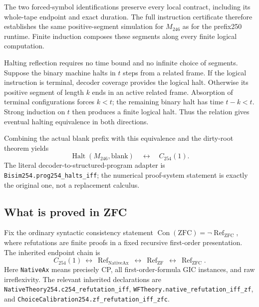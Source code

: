 The two forced-symbol identifications preserve every local contract,
including its whole-tape endpoint and exact duration.  The full instruction
certificate therefore establishes the same positive-segment simulation
for $M_{246}$ as for the prefix250 runtime.  Finite induction composes these
segments along every finite logical computation.

Halting reflection requires no time bound and no infinite choice of
segments.  Suppose the binary machine halts in $t$ steps from a related
frame.  If the logical instruction is terminal, decoder coverage provides
the logical halt.  Otherwise its positive segment of length $k$ ends in an
active related frame.  Absorption of terminal configurations forces $k<t$;
the remaining binary halt has time $t-k<t$.  Strong induction on $t$ then
produces a finite logical halt.  Thus the relation gives eventual halting
equivalence in both directions.

Combining the actual blank prefix with this equivalence and the dirty-root
theorem yields
\[
 \operatorname{Halt}(M_{246},\mathrm{blank})
 \quad\longleftrightarrow\quad C_{254}(1).
\]
The literal decoder-to-structured-program adapter is
\texttt{Bisim254.prog254\_halts\_iff}; the numerical proof-system
statement is exactly the original one, not a replacement calculus.

\subsection{What is proved in ZFC}

Fix the ordinary syntactic consistency statement
$\operatorname{Con}(\mathrm{ZFC})=\neg\operatorname{Ref}_{\mathrm{ZFC}}$,
where refutations are finite proofs in a fixed recursive first-order
presentation.  The inherited endpoint chain is
\[
 C_{254}(1)
 \ \longleftrightarrow\ 
 \operatorname{Ref}_{\mathrm{NativeAx}}
 \ \longleftrightarrow\ 
 \operatorname{Ref}_{\mathrm{ZF}}
 \ \longleftrightarrow\ 
 \operatorname{Ref}_{\mathrm{ZFC}}.
\]
Here \texttt{NativeAx} means precisely CP, all first-order-formula GIC
instances, and raw irreflexivity.  The relevant inherited declarations are
\texttt{NativeTheory254.c254\_refutation\_iff},
\texttt{WFTheory.native\_refutation\_iff\_zf}, and
\texttt{ChoiceCalibration254.zf\_refutation\_iff\_zfc}.

